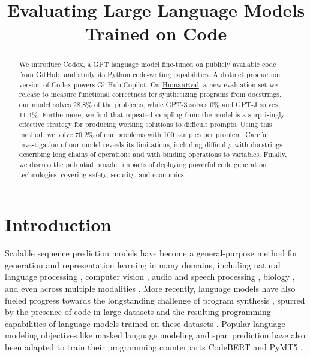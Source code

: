 \title{Evaluating Large Language Models Trained on Code}

\begin{abstract}
We introduce Codex, a GPT language model fine-tuned on publicly available code from GitHub, and study its Python code-writing capabilities. A distinct production version of Codex powers GitHub Copilot. On \href{https://github.com/openai/human-eval}{HumanEval}, a new evaluation set we release to measure functional correctness for synthesizing programs from docstrings, our model solves 28.8\% of the problems, while GPT-3 solves 0\% and GPT-J solves 11.4\%. Furthermore, we find that repeated sampling from the model is a surprisingly effective strategy for producing working solutions to difficult prompts. Using this method, we solve 70.2\% of our problems with 100 samples per problem. Careful investigation of our model reveals its limitations, including difficulty with docstrings describing long chains of operations and with binding operations to variables. Finally, we discuss the potential broader impacts of deploying powerful code generation technologies, covering safety, security, and economics.
\end{abstract}

\section{Introduction}
\label{sec:intro}

Scalable sequence prediction models \cite{graves2014generating,vaswani2017transformer,child2019sparsetransformer} have become a general-purpose method for generation and representation learning in many domains, including natural language processing \citep{mikolov2013distributed, sutskever2014sequence, dai2015semi, peters2018deep, radford2018improving, devlin2018bert}, computer vision \citep{van2016pixel, menick2018generating,chen2020generative, bao2021beit}, audio and speech processing \citep{oord2016wavenet, oord2018representation, dhariwal2020jukebox, baevski2020wav2vec}, biology \citep{alley2019unified, rives2021biological}, and even across multiple modalities \citep{das2017visual, lu2019vilbert, ramesh2021dalle, zellers2021merlot}. More recently, language models have also fueled progress towards the longstanding challenge of program synthesis \citep{simon1963compiler, manna1971progsyn}, spurred by the presence of code in large datasets \citep{husain2019codesearchnet, gao2020pile} and the resulting programming capabilities of language models trained on these datasets \cite{gpt-j}. Popular language modeling objectives like masked language modeling \citep{devlin2018bert} and span prediction \citep{raffel2020t5} have also been adapted to train their programming counterparts CodeBERT \citep{feng2020codebert} and PyMT5 \citep{clement2020pymt5}.

